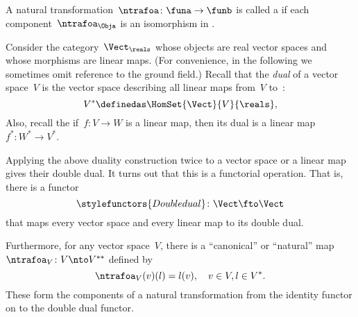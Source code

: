 \begin{figure}[h!]
  \begin{center}
  \end{center}
  \caption{
  \label{fig:nat_trans_graphically}}
\end{figure}

\begin{ctdefinition}
  \label{def:nat_iso}
  A natural transformation~$\ntrafoa \colon \funa \to \funb $ is called a \emph{} if each component~$\ntrafoa_\Obja$ is an isomorphism in \CatD.
\end{ctdefinition}

\begin{example}\label{ex:Vect}
  Consider the category~$\Vect_{\reals}$ whose objects are real vector spaces and whose morphisms are linear maps. (For convenience, in the following we sometimes omit reference to the ground field.) Recall that the \emph{dual} of a vector space~$V$ is the vector space describing all linear maps from~$V$ to~\reals:
  \begin{equation*}
    V^* \definedas \HomSet{\Vect}{V}{\reals},
  \end{equation*}
  Also, recall the if~$f\colon V \to W$ is a linear map, then its dual is a linear map~$f^*\colon W^* \to V^*$.

  Applying the above duality construction twice to a vector space or a linear map gives their double dual. It turns out that this is a functorial operation. That is, there is a functor~
  \begin{equation*}
      \stylefunctors{Double dual}\colon \Vect \fto \Vect
  \end{equation*}
  that maps every vector space and every linear map to its double dual.

  Furthermore, for any vector space~$V$, there is a ``canonical'' or ``natural'' map~$\ntrafoa_V \colon V \nto V^{**}$ defined by
  \begin{equation*}
    \ntrafoa_V(v)(l) = l(v), \quad  v \in V, l \in V^*.
  \end{equation*}
  These form the components of a natural transformation from the identity functor on \Vect to the double dual functor.
  \begin{center}
  \end{center}
\end{example}



